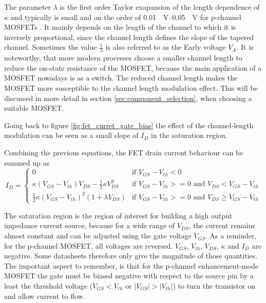 The parameter $\lambda$ is the first order Taylor exapansion of the length dependence of $\kappa$ and typically is small and on the order of \qtyrange[per-mode=power]{0.01}{0.05}{\per \volt} for p-channel MOSFETs \citep[p. 23]{mosfet_flicker_noise}. It mainly depends on the length of the channel to which it is inversely proportional, since the channel length defines the slope of the tapered channel. Sometimes the value $\frac{1}{\lambda}$ is also referred to as the Early voltage $V_A$. It is noteworthy, that more modern processes choose a smaller channel length to reduce the on-state resistance of the MOSFET, because the main application of a MOSFET nowadays is as a switch. The reduced channel length makes the MOSFET more susceptible to the channel length modulation effect. This will be discussed in more detail in section \ref{sec:component_selection}, when choosing a suitable MOSFET.

Going back to figure \ref{fig:fet_curret_gate_bias} the effect of the channel-length modulation can be seen as a small slope of $I_D$ in the saturation region.

Combining the previous equations, the FET drain current behaviour can be summed up as
\begin{equation}
    I_D = \begin{cases}
        0 & \text{if } V_{GS} - V_{th} < 0\\
        \kappa (V_{GS} - V_{th}) V_{DS} - \frac 1 2 \kappa V_{DS}^2 & \text{if } V_{GS} - V_{th} >= 0 \text{ and } V_{DS} < V_{GS} - V_{th}\\
        \frac 1 2 \kappa \left(V_{GS} - V_{th} \right)^2 (1 + \lambda V_{DS}) & \text{if } V_{GS} - V_{th} >= 0 \text{ and } V_{DS} \geq V_{GS} - V_{th}
    \end{cases}
    \label{eqn:mosfet_id_large_signal}
\end{equation}

The saturation region is the region of interest for building a high output impedance current source, because for a wide range of $V_{DS}$, the current remains almost constant and can be adjusted using the gate voltage $V_{GS}$. As a reminder, for the p-channel MOSFET, all voltages are reversed. $V_{GS}$, $V_{th}$, $V_{DS}$, $\kappa$ and $I_D$ are negative. Some datasheets therefore only give the magnitude of those quantities. The important aspect to remember, is that for the p-channel enhancement-mode MOSFET the gate must be biased negative with respect to the source pin by a least the threshold voltage ($V_{GS} < V_{th}$ or $|V_{GS}| > |V_{th}|$) to turn the transistor on and allow current to flow.

